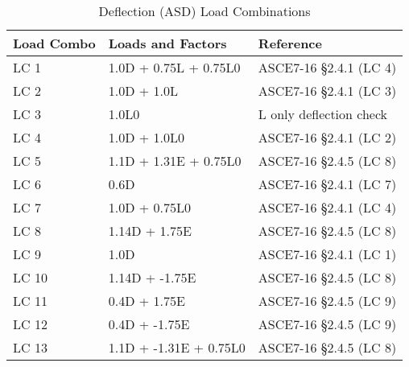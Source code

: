 \documentclass[12pt, fleqn]{article}
\begin{document}
\begin{table}[H]
\caption{Deflection (ASD) Load Combinations}
\centering
\begin{tabular}{l l l}
\hline
Load Combo & Loads and Factors & Reference\\
\hline
LC 1 & 1.0D + 0.75L\textsubscriptr0 + 0.75L0 & ASCE7-16 \S2.4.1 (LC 4)\\
LC 2 & 1.0D + 1.0L\textsubscriptr0 & ASCE7-16 \S2.4.1 (LC 3)\\
LC 3 & 1.0L0 & L only deflection check\\
LC 4 & 1.0D + 1.0L0 & ASCE7-16 \S2.4.1 (LC 2)\\
LC 5 & 1.1D + 1.31E + 0.75L0 & ASCE7-16 \S2.4.5 (LC 8)\\
LC 6 & 0.6D & ASCE7-16 \S2.4.1 (LC 7)\\
LC 7 & 1.0D + 0.75L0 & ASCE7-16 \S2.4.1 (LC 4)\\
LC 8 & 1.14D + 1.75E & ASCE7-16 \S2.4.5 (LC 8)\\
LC 9 & 1.0D & ASCE7-16 \S2.4.1 (LC 1)\\
LC 10 & 1.14D + -1.75E & ASCE7-16 \S2.4.5 (LC 8)\\
LC 11 & 0.4D + 1.75E & ASCE7-16 \S2.4.5 (LC 9)\\
LC 12 & 0.4D + -1.75E & ASCE7-16 \S2.4.5 (LC 9)\\
LC 13 & 1.1D + -1.31E + 0.75L0 & ASCE7-16 \S2.4.5 (LC 8)\\
\hline
\end{tabular}
\end{table}
\end{document}
